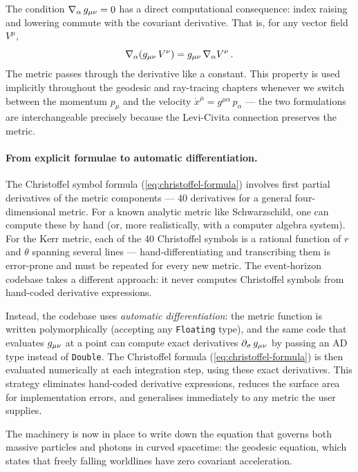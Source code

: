 The condition $\nabla_{\alpha}\,g_{\mu\nu} = 0$ has a direct computational
consequence: index raising and lowering commute with the covariant derivative.
That is, for any vector field $V^\mu$,
%
\begin{equation}
  \nabla_{\alpha}(g_{\mu\nu}\, V^\nu) = g_{\mu\nu}\, \nabla_{\alpha} V^\nu \,.
  \label{eq:metric-commutes-cd}
\end{equation}
%
The metric passes through the derivative like a constant.  This property is used
implicitly throughout the geodesic and ray-tracing chapters whenever we switch
between the momentum $p_\mu$ and the velocity
$\dot{x}^\mu = g^{\mu\alpha}\, p_\alpha$ --- the two formulations are
interchangeable precisely because the Levi-Civita connection preserves the
metric.

\paragraph{From explicit formulae to automatic differentiation.}

The Christoffel symbol formula (\cref{eq:christoffel-formula}) involves first
partial derivatives of the metric components --- 40 derivatives for a general
four-dimensional metric.  For a known analytic metric like Schwarzschild, one
can compute these by hand (or, more realistically, with a computer algebra
system).  For the Kerr metric, each of the 40 Christoffel symbols is a rational
function of $r$ and $\theta$ spanning several lines --- hand-differentiating and
transcribing them is error-prone and must be repeated for every new metric.  The
event-horizon codebase takes a different approach: it never computes Christoffel
symbols from hand-coded derivative expressions.

Instead, the codebase uses \emph{automatic differentiation}: the metric
function is written polymorphically (accepting any \texttt{Floating} type), and
the same code that evaluates $g_{\mu\nu}$ at a point can compute exact
derivatives $\partial_{\sigma}\,g_{\mu\nu}$ by passing an AD type instead of
\texttt{Double}.  The Christoffel formula (\cref{eq:christoffel-formula})
is then evaluated numerically at each integration step, using these exact
derivatives.  This strategy eliminates hand-coded derivative expressions,
reduces the surface area for implementation errors, and generalises
immediately to any metric the user supplies.

The machinery is now in place to write down the equation that governs both
massive particles and photons in curved spacetime: the geodesic equation, which
states that freely falling worldlines have zero covariant acceleration.
